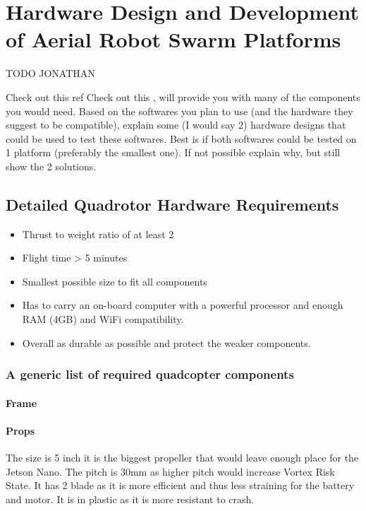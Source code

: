 \chapter{Hardware Design and Development of Aerial Robot Swarm Platforms}
 {\color{red}TODO JONATHAN}

Check out this ref
    {\color{red} Check out this \cite{dojofordrones_rpi_drone}, will provide you with many of the components you would need.}
Based on the softwares you plan to use (and the hardware they suggest to be compatible), explain some (I would say 2) hardware designs that could be used to test these softwares. Best is if both softwares could be tested on 1 platform (preferably the smallest one). If not possible explain why, but still show the 2 solutions.

\section{Detailed Quadrotor Hardware Requirements}
\begin{itemize}
    \item Thrust to weight ratio of at least 2
    \item Flight time > 5 minutes
    \item Smallest possible size to fit all components
    \item Has to carry an on-board computer with a powerful processor and enough RAM (4GB) and WiFi compatibility.
    \item Overall as durable as possible and protect the weaker components.
\end{itemize}

\subsection{A generic list of required quadcopter components}

\subsubsection{Frame}

\subsubsection{Props}
The size is 5 inch it is the biggest propeller that would leave enough place for the Jetson Nano. The pitch is 30mm as higher pitch would increase Vortex Risk State. It has 2 blade as it is more efficient and thus less straining for the battery and motor. It is in plastic as it is more resistant to crash.

